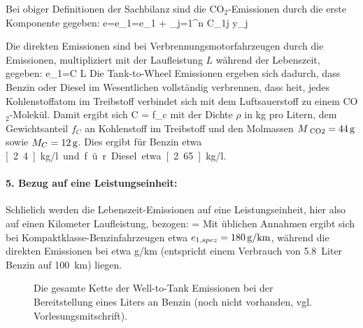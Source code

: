 
Bei obiger Definitionen der Sachbilanz sind 
die CO$_2$-Emissionen durch  die erste Komponente gegeben:
\be
\label{emissionenCO2-LCA}
e=e_1=e_1 + \sum_{j=1}^n C_{1j} y_j
\ee

Die direkten Emissionen sind bei Verbrennungsmotorfahrzeugen durch
die
 Emissionen, multipliziert mit der Laufleistung
$L$ w\"ahrend der Lebenszeit, gegeben:
\be
e_1=C L
\ee
Die  Tank-to-Wheel Emissionen ergeben sich dadurch, dass Benzin oder
Diesel im Wesentlichen vollst\"andig verbrennen, dass hei\3t, jedes
Kohlenstoffatom im Treibstoff verbindet sich mit dem Luftsauerstoff zu
einem CO$_2$-Molek\"ul. Damit ergibt sich
\be
C = \rho f_c 
\ee
mit der Dichte $\rho$ in kg pro Litern, dem Gewichtsanteil $f_C$ an
Kohlenstoff im Treibstoff und den Molmassen $M\sub{CO2}=\unit[44]{g}$ sowie
$M_C=\unit[12]{g}$. Dies ergibt f\"ur Benzin etwa \unit[2.4]{kg/l} und f\"ur
Diesel etwa \unit[2.65]{kg/l}.

\paragraph{5. Bezug auf eine Leistungseinheit:}
Schlie\3lich werden die Lebenszeit-Emissionen auf eine
Leistungseinheit, hier also auf einen Kilometer Laufleistung, bezogen:
\be
\label{eLCAspez}
=
\ee
Mit \"ublichen Annahmen ergibt sich bei Kompaktklasse-Benzinfahrzeugen
etwa $e_{1,spez}=\unit[180]{g/km}$, w\"ahrend die direkten Emissionen
bei etwa \unit[140]{g/km} (entspricht einem Verbrauch von 5.8~Liter
Benzin auf 100~km) liegen.


\begin{figure}
\caption{\label{fig:WtT}Die gesamte Kette der Well-to-Tank Emissionen
  bei der Bereitstellung eines Liters an Benzin (noch nicht vorhanden,
 vgl. Vorlesungsmitschrift).
} 
\end{figure}



